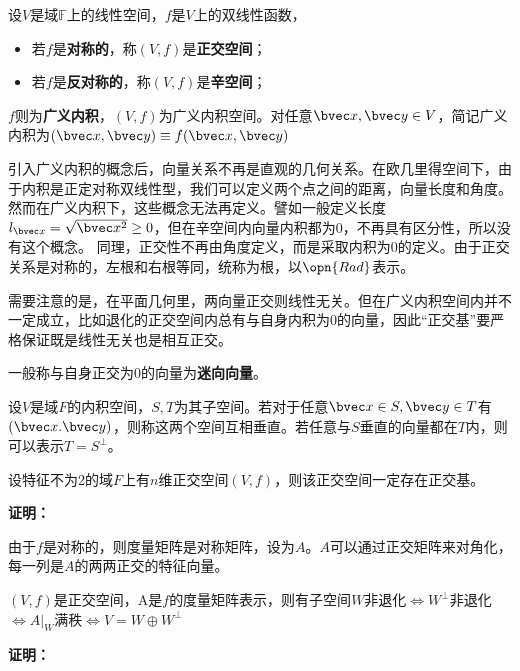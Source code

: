 
\begin{definition}{}
设$V$是域$\mathbb F$上的线性空间，$f$是$V$上的双线性函数，
\begin{itemize}
\item 若$f$是\textbf{对称的}，称$(V,f)$是\textbf{正交空间}；
\item 若$f$是\textbf{反对称的}，称$(V,f)$是\textbf{辛空间}；
\end{itemize}
$f$则为\textbf{广义内积}，$(V,f)$为广义内积空间。对任意$\bvec x,\bvec y\in V$，简记广义内积为$(\bvec x,\bvec y)\equiv f(\bvec x,\bvec y)$
\end{definition}
引入广义内积的概念后，向量关系不再是直观的几何关系。在欧几里得空间下，由于内积是正定对称双线性型，我们可以定义两个点之间的距离，向量长度和角度。然而在广义内积下，这些概念无法再定义。譬如一般定义长度$l_{\bvec x}=\sqrt{\bvec x^2}\ge 0$，但在辛空间内向量内积都为0，不再具有区分性，所以没有这个概念。
同理，正交性不再由角度定义，而是采取内积为$0$的定义。由于正交关系是对称的，左根和右根等同，统称为根，以$\opn{Rad}$表示。

需要注意的是，在平面几何里，两向量正交则线性无关。但在广义内积空间内并不一定成立，比如退化的正交空间内总有与自身内积为0的向量，因此“正交基”要严格保证既是线性无关也是相互正交。

一般称与自身正交为$0$的向量为\textbf{迷向向量}。

\begin{definition}{}
设$V$是域$F$的内积空间，$S,T$为其子空间。若对于任意$\bvec x\in S,\bvec  y\in T$有$(\bvec x.\bvec y)$，则称这两个空间互相垂直。若任意与$S$垂直的向量都在$T$内，则可以表示$T=S^{\bot}$。
\end{definition}
\begin{theorem}{}
设特征不为2的域$F$上有$n$维正交空间$(V,f)$，则该正交空间一定存在正交基。
\end{theorem}
\textbf{证明：}

由于$f$是对称的，则度量矩阵是对称矩阵，设为$A$。$A$可以通过正交矩阵来对角化，每一列是$A$的两两正交的特征向量。



\begin{theorem}{}\label{the_OrSp_1}
$(V,f)$是正交空间，A是$f$的度量矩阵表示，则有子空间$W$非退化$\Longleftrightarrow  W^{\bot}$非退化$\Longleftrightarrow A|_{W}$满秩$\Longleftrightarrow V=W\oplus W^{\bot} $
\end{theorem}
\textbf{证明：}


